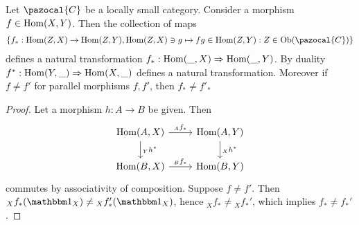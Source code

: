 \begin{lemma}\label{PreCompositionIsANaturalTransformationAndThisAssignmentIsInjective}
    Let $\pazocal{C}$ be a locally small category. Consider a morphism $f\in \mathrm{Hom}(X,Y)$. Then the collection of maps
    \begin{gather*}
        \{ f_\ast : \Hom(Z,X)\rightarrow \Hom(Z,Y), \Hom(Z,X)\ni g \mapsto fg \in \Hom(Z,Y) : Z\in \Ob(\pazocal{C})\}
    \end{gather*}
    defines a natural transformation $f_\ast : \mathrm{Hom}(\_,X)\Rightarrow \mathrm{Hom}(\_,Y)$. By duality $f^\ast : \mathrm{Hom}(Y,\_)\Rightarrow \mathrm{Hom}(X,\_)$ defines a natural transformation. Moreover if $f\neq f'$ for parallel morphisms $f,f'$, then $f_\ast \neq f'_\ast$
\end{lemma}
\begin{proof}
    Let a morphism $h : A\rightarrow B$ be given. Then
    $$
        \begin{tikzcd}
            \Hom(A,X)\arrow[r,"_Af_\ast"]\arrow[d,"{_Y}h^\ast"] & \Hom(A,Y)\arrow[d,"{_X}h^\ast"]\\
            \Hom(B,X) \arrow[r,"{_B}f_\ast"] & \Hom(B,Y)
        \end{tikzcd}
    $$
    commutes by associativity of composition. Suppose $f\neq f'$. Then ${_X}f_\ast(\fone_X) \neq {_X}f_\ast'(\fone_X)$, hence ${_X}f_\ast\neq {_X}f_\ast'$, which implies $f_\ast \neq f_\ast'$.
\end{proof}
